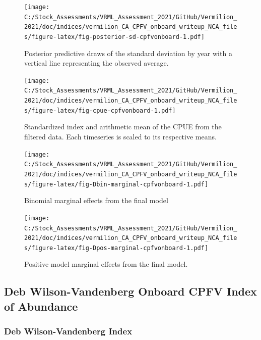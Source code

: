 \documentclass[
  english,
  a4paper,
]{article}
\begin{document}
\begin{figure}
\centering
\texttt{[image: C:/Stock\_Assessments/VRML\_Assessment\_2021/GitHub/Vermilion\_2021/doc/indices/vermilion\_CA\_CPFV\_onboard\_writeup\_NCA\_files/figure-latex/fig-posterior-sd-cpfvonboard-1.pdf]}
\caption{\label{fig:fig-posterior-sd-cpfvonboard}Posterior predictive draws of the standard deviation by year with a vertical line representing the observed average.}
\end{figure}

\begin{figure}
\centering
\texttt{[image: C:/Stock\_Assessments/VRML\_Assessment\_2021/GitHub/Vermilion\_2021/doc/indices/vermilion\_CA\_CPFV\_onboard\_writeup\_NCA\_files/figure-latex/fig-cpue-cpfvonboard-1.pdf]}
\caption{\label{fig:fig-cpue-cpfvonboard}Standardized index and arithmetic mean of the CPUE from the filtered data. Each timeseries is scaled to its respective means.}
\end{figure}

\begin{figure}
\centering
\texttt{[image: C:/Stock\_Assessments/VRML\_Assessment\_2021/GitHub/Vermilion\_2021/doc/indices/vermilion\_CA\_CPFV\_onboard\_writeup\_NCA\_files/figure-latex/fig-Dbin-marginal-cpfvonboard-1.pdf]}
\caption{\label{fig:fig-Dbin-marginal-cpfvonboard}Binomial marginal effects from the final model}
\end{figure}

\begin{figure}
\centering
\texttt{[image: C:/Stock\_Assessments/VRML\_Assessment\_2021/GitHub/Vermilion\_2021/doc/indices/vermilion\_CA\_CPFV\_onboard\_writeup\_NCA\_files/figure-latex/fig-Dpos-marginal-cpfvonboard-1.pdf]}
\caption{\label{fig:fig-Dpos-marginal-cpfvonboard}Positive model marginal effects from the final model.}
\end{figure}

\clearpage

\hypertarget{debwv-index}{%
\subsection{Deb Wilson-Vandenberg Onboard CPFV Index of Abundance}\label{debwv-index}}

\hypertarget{deb-wilson-vandenberg-index}{%
\subsubsection{Deb Wilson-Vandenberg Index}\label{deb-wilson-vandenberg-index}}
\end{document}
